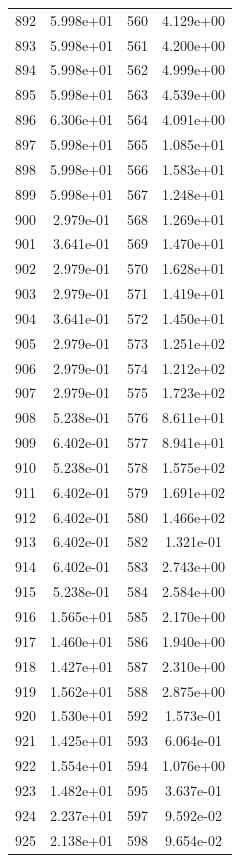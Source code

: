 \documentclass[12pt]{article}
\begin{document}
\begin{longtable}{@{}cccc@{}}
892 & 5.998e+01 & 560 & 4.129e+00 \\
893 & 5.998e+01 & 561 & 4.200e+00 \\
894 & 5.998e+01 & 562 & 4.999e+00 \\
895 & 5.998e+01 & 563 & 4.539e+00 \\
896 & 6.306e+01 & 564 & 4.091e+00 \\
897 & 5.998e+01 & 565 & 1.085e+01 \\
898 & 5.998e+01 & 566 & 1.583e+01 \\
899 & 5.998e+01 & 567 & 1.248e+01 \\
900 & 2.979e-01 & 568 & 1.269e+01 \\
901 & 3.641e-01 & 569 & 1.470e+01 \\
902 & 2.979e-01 & 570 & 1.628e+01 \\
903 & 2.979e-01 & 571 & 1.419e+01 \\
904 & 3.641e-01 & 572 & 1.450e+01 \\
905 & 2.979e-01 & 573 & 1.251e+02 \\
906 & 2.979e-01 & 574 & 1.212e+02 \\
907 & 2.979e-01 & 575 & 1.723e+02 \\
908 & 5.238e-01 & 576 & 8.611e+01 \\
909 & 6.402e-01 & 577 & 8.941e+01 \\
910 & 5.238e-01 & 578 & 1.575e+02 \\
911 & 6.402e-01 & 579 & 1.691e+02 \\
912 & 6.402e-01 & 580 & 1.466e+02 \\
913 & 6.402e-01 & 582 & 1.321e-01 \\
914 & 6.402e-01 & 583 & 2.743e+00 \\
915 & 5.238e-01 & 584 & 2.584e+00 \\
916 & 1.565e+01 & 585 & 2.170e+00 \\
917 & 1.460e+01 & 586 & 1.940e+00 \\
918 & 1.427e+01 & 587 & 2.310e+00 \\
919 & 1.562e+01 & 588 & 2.875e+00 \\
920 & 1.530e+01 & 592 & 1.573e-01 \\
921 & 1.425e+01 & 593 & 6.064e-01 \\
922 & 1.554e+01 & 594 & 1.076e+00 \\
923 & 1.482e+01 & 595 & 3.637e-01 \\
924 & 2.237e+01 & 597 & 9.592e-02 \\
925 & 2.138e+01 & 598 & 9.654e-02 \\

\end{longtable}
\end{document}
